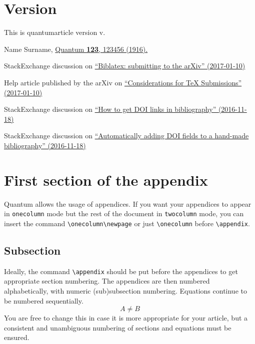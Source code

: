 \documentclass[a4paper,twocolumn,11pt,accepted=2017-05-09]{quantumarticle}
\begin{document}
\section{Version}
\label{sec:version}
This is quantumarticle version v\quantumarticleversion.


\begin{thebibliography}{9}
  Name Surname,
  \href{https://doi.org/10.22331/
        idonotexist}{Quantum
        \textbf{123}, 123456 (1916).}

  StackExchange discussion on \href{http://tex.stackexchange.com/questions/26990/biblatex-submitting-to-the-arxiv}{``Biblatex: submitting to the arXiv'' (2017-01-10)}

  Help article published by the arXiv on \href{https://arxiv.org/help/submit_tex}{``Considerations for TeX Submissions'' (2017-01-10)}

  StackExchange discussion on \href{http://tex.stackexchange.com/questions/3802/how-to-get-doi-links-in-bibliography}{``How to get DOI links in bibliography'' (2016-11-18)}

  StackExchange discussion on \href{http://tex.stackexchange.com/questions/6810/automatically-adding-doi-fields-to-a-hand-made-bibliography}{``Automatically adding DOI fields to a hand-made bibliography'' (2016-11-18)}
\end{thebibliography}



\onecolumn
\appendix

\section{First section of the appendix}
Quantum allows the usage of appendices.
If you want your appendices to appear in \texttt{onecolumn} mode but the rest of the
document in \texttt{twocolumn} mode, you can insert the command
\texttt{\textbackslash{}onecolumn\textbackslash{}newpage} or just
\texttt{\textbackslash{}onecolumn} before
\texttt{\textbackslash{}appendix}.


\subsection{Subsection}
Ideally, the command \texttt{\textbackslash{}appendix} should be put before the appendices to get appropriate section numbering.
The appendices are then numbered alphabetically, with numeric (sub)subsection numbering.
Equations continue to be numbered sequentially.
\begin{equation}
  A \neq B
\end{equation}
You are free to change this in case it is more appropriate for your article, but a consistent and unambiguous numbering of sections and equations must be ensured.
\end{document}

